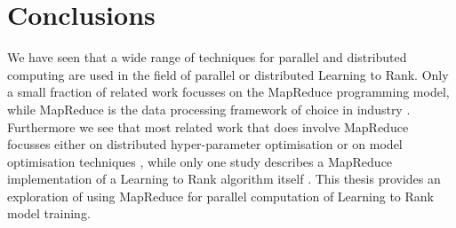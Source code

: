 \section{Conclusions}
We have seen that a wide range of techniques for parallel and distributed computing are used in the field of parallel or distributed Learning to Rank. Only a small fraction of related work focusses on the MapReduce programming model, while MapReduce is the data processing framework of choice in industry \cite{Lin2013}. Furthermore we see that most related work that does involve MapReduce focusses either on distributed hyper-parameter optimisation \cite{Ganjisaffar2011} or on model optimisation techniques \cite{Long2012,Zinkevich2010}, while only one study describes a MapReduce implementation of a Learning to Rank algorithm itself \cite{Karimzadehgan2011}. This thesis provides an exploration of using MapReduce for parallel computation of Learning to Rank model training.